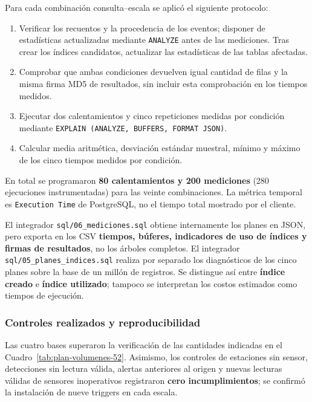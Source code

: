\documentclass[12pt,a4paper]{article}
\begin{document}
Para cada combinación consulta--escala se aplicó el siguiente protocolo:
\begin{enumerate}[leftmargin=*,itemsep=0.15em]
    \item Verificar los recuentos y la procedencia de los eventos;
    disponer de estadísticas actualizadas mediante \texttt{ANALYZE}
    antes de las mediciones. Tras crear los índices candidatos,
    actualizar las estadísticas de las tablas afectadas.
    \item Comprobar que ambas condiciones devuelven igual cantidad
    de filas y la misma firma MD5 de resultados, sin incluir esta
    comprobación en los tiempos medidos.
    \item Ejecutar dos calentamientos y cinco repeticiones medidas
    por condición mediante
    \texttt{EXPLAIN (ANALYZE, BUFFERS, FORMAT JSON)}.
    \item Calcular media aritmética, desviación estándar muestral,
    mínimo y máximo de los cinco tiempos medidos por condición.
\end{enumerate}

En total se programaron \textbf{80 calentamientos y 200
mediciones} (280 ejecuciones instrumentadas) para las veinte
combinaciones. La métrica temporal es \texttt{Execution Time} de
PostgreSQL, no el tiempo total mostrado por el cliente.

El integrador \nolinkurl{sql/06_mediciones.sql} obtiene internamente
los planes en JSON, pero exporta en los CSV \textbf{tiempos,
búferes, indicadores de uso de índices y firmas de resultados},
no los árboles completos. El integrador
\nolinkurl{sql/05_planes_indices.sql} realiza por separado los
diagnósticos de los cinco planes sobre la base de un millón de
registros. Se distingue así entre \textbf{índice creado} e
\textbf{índice utilizado}; tampoco se interpretan los costos
estimados como tiempos de ejecución.

\subsubsection{Controles realizados y reproducibilidad}

Las cuatro bases superaron la verificación de las cantidades
indicadas en el Cuadro~\ref{tab:plan-volumenes-52}. Asimismo,
los controles de estaciones sin sensor, detecciones sin lectura
válida, alertas anteriores al origen y nuevas lecturas válidas de
sensores inoperativos registraron \textbf{cero incumplimientos};
se confirmó la instalación de nueve triggers en cada escala.
\end{document}
